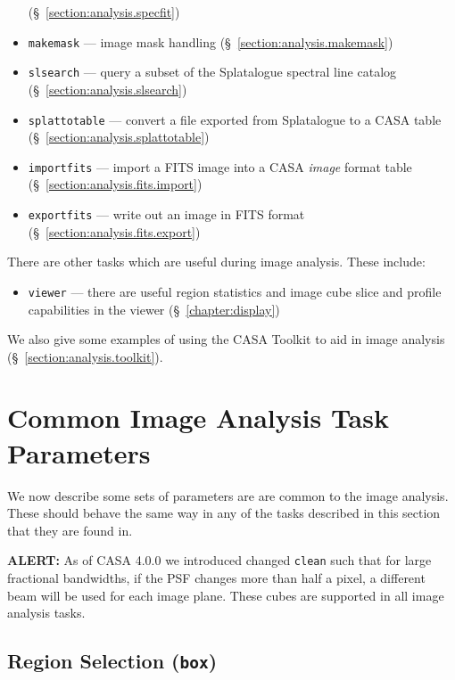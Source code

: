 \begin{itemize}
        (\S~\ref{section:analysis.specfit})
    \item {\tt makemask} --- image mask handling
         (\S~\ref{section:analysis.makemask})
  \item{\tt slsearch} --- query a subset of the Splatalogue spectral
line catalog
          (\S~\ref{section:analysis.slsearch})
  \item{\tt splattotable} --- convert a file exported from Splatalogue
to a CASA table 
          (\S~\ref{section:analysis.splattotable})
   \item {\tt importfits} --- import a FITS image into a CASA  
         {\it image} format table 
         (\S~\ref{section:analysis.fits.import})
   \item {\tt exportfits} --- write out an image in FITS format
         (\S~\ref{section:analysis.fits.export})
\end{itemize}

There are other tasks which are useful during image analysis.  These
include:
\begin{itemize}
   \item {\tt viewer} --- there are useful region statistics and
         image cube slice and profile capabilities in the viewer 
         (\S~\ref{chapter:display})
\end{itemize}

We also give some examples of using the CASA Toolkit to aid in
image analysis (\S~\ref{section:analysis.toolkit}).

\section{Common Image Analysis Task Parameters}
\label{section:analysis.pars}

We now describe some sets of parameters are are common to the image
analysis.  These should behave the same way in any of the tasks
described in this section that they are found in.  

{\bf ALERT:} As of CASA 4.0.0 we introduced changed {\tt clean} such
that for large fractional bandwidths, if the PSF changes more than
half a pixel, a different beam will be used for each image
plane. These cubes are supported in all image analysis tasks.  

\subsection{Region Selection ({\tt box})}
\label{section:analysis.pars.box}


